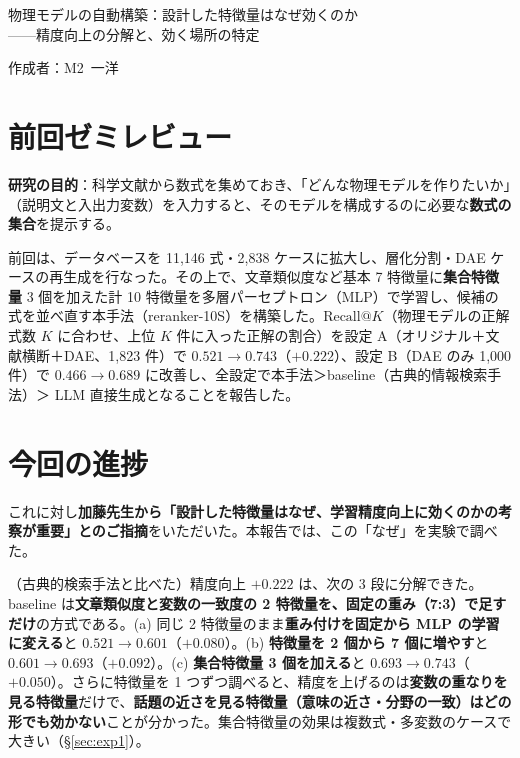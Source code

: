 \documentclass[11pt,a4paper]{ltjsarticle}
\makeatletter
\newcommand{\rk}{\textrm{Recall@}K}
\makeatother
\begin{document}
\begin{center}
{\sffamily\large 物理モデルの自動構築：設計した特徴量はなぜ効くのか\\——精度向上の分解と、効く場所の特定}
\end{center}
\vspace{0.3em}
\hfill 作成者：M2\ 一洋
\vspace{0.8em}

\section{前回ゼミレビュー}
\textbf{研究の目的}：科学文献から数式を集めておき、「どんな物理モデルを作りたいか」（説明文と入出力変数）を入力すると、そのモデルを構成するのに必要な\textbf{数式の集合}を提示する。


  前回は、データベースを 11,146 式・2,838 ケースに拡大し、層化分割・DAE ケースの再生成を行なった。その上で、文章類似度など基本 7 特徴量に\textbf{集合特徴量} 3 個を加えた計 10 特徴量を多層パーセプトロン（MLP）で学習し、候補の式を並べ直す本手法（reranker-10S）を構築した。$\rk$（物理モデルの正解式数 $K$ に合わせ、上位 $K$ 件に入った正解の割合）を設定 A（オリジナル＋文献横断＋DAE、1{,}823 件）で $0.521\to0.743$（$+0.222$）、設定 B（DAE のみ 1{,}000 件）で $0.466\to0.689$ に改善し、全設定で本手法＞baseline（古典的情報検索手法）＞ LLM 直接生成となることを報告した。
  


\section{今回の進捗}
これに対し\textbf{加藤先生から「設計した特徴量はなぜ、学習精度向上に効くのかの考察が重要」とのご指摘}をいただいた。本報告では、この「なぜ」を実験で調べた。

（古典的検索手法と比べた）精度向上 $+0.222$ は、次の 3 段に分解できた。baseline は\textbf{文章類似度と変数の一致度の 2 特徴量を、固定の重み（7:3）で足すだけ}の方式である。(a) 同じ 2 特徴量のまま\textbf{重み付けを固定から MLP の学習に変える}と $0.521\to0.601$（$+0.080$）。(b) \textbf{特徴量を 2 個から 7 個に増やす}と $0.601\to0.693$（$+0.092$）。(c) \textbf{集合特徴量 3 個を加える}と $0.693\to0.743$（$+0.050$）。さらに特徴量を 1 つずつ調べると、精度を上げるのは\textbf{変数の重なりを見る特徴量}だけで、\textbf{話題の近さを見る特徴量（意味の近さ・分野の一致）はどの形でも効かない}ことが分かった。集合特徴量の効果は複数式・多変数のケースで大きい（\S\ref{sec:exp1}）。
  
\end{document}
